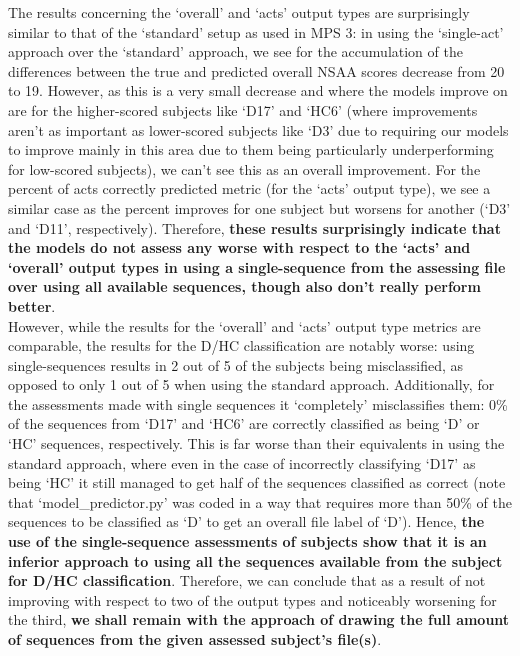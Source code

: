\documentclass[12pt,twoside]{report}
\begin{document}
\quad The results concerning the ‘overall’ and ‘acts’ output types are surprisingly similar to that of the ‘standard’ setup as used in MPS 3: in using the ‘single-act’ approach over the ‘standard’ approach, we see for the accumulation of the differences between the true and predicted overall NSAA scores decrease from 20 to 19. However, as this is a very small decrease and where the models improve on are for the higher-scored subjects like ‘D17’ and ‘HC6’ (where improvements aren’t as important as lower-scored subjects like ‘D3’ due to requiring our models to improve mainly in this area due to them being particularly underperforming for low-scored subjects), we can’t see this as an overall improvement. For the percent of acts correctly predicted metric (for the ‘acts’ output type), we see a similar case as the percent improves for one subject but worsens for another (‘D3’ and ‘D11’, respectively). Therefore, \textbf{these results surprisingly indicate that the models do not assess any worse with respect to the ‘acts’ and ‘overall’ output types in using a single-sequence from the assessing file over using all available sequences, though also don’t really perform better}.\\

\quad However, while the results for the ‘overall’ and ‘acts’ output type metrics are comparable, the results for the D/HC classification are notably worse: using single-sequences results in 2 out of 5 of the subjects being misclassified, as opposed to only 1 out of 5 when using the standard approach. Additionally, for the assessments made with single sequences it ‘completely’ misclassifies them: 0\% of the sequences from ‘D17’ and ‘HC6’ are correctly classified as being ‘D’ or ‘HC’ sequences, respectively. This is far worse than their equivalents in using the standard approach, where even in the case of incorrectly classifying ‘D17’ as being ‘HC’ it still managed to get half of the sequences classified as correct (note that ‘model\_predictor.py’ was coded in a way that requires more than 50\% of the sequences to be classified as ‘D’ to get an overall file label of ‘D’). Hence, \textbf{the use of the single-sequence assessments of subjects show that it is an inferior approach to using all the sequences available from the subject for D/HC classification}. Therefore, we can conclude that as a result of not improving with respect to two of the output types and noticeably worsening for the third, \textbf{we shall remain with the approach of drawing the full amount of sequences from the given assessed subject’s file(s)}.
\end{document}
